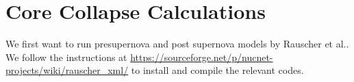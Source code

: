 \section*{Core Collapse Calculations} \hypertarget{sec:corecoll}{}

\hspace{12ex}We first want to run presupernova and post supernova models by Rauscher et al..
We follow the instructions at
\url{https://sourceforge.net/p/nucnet-projects/wiki/rauscher_xml/} to install
and compile the relevant codes.


